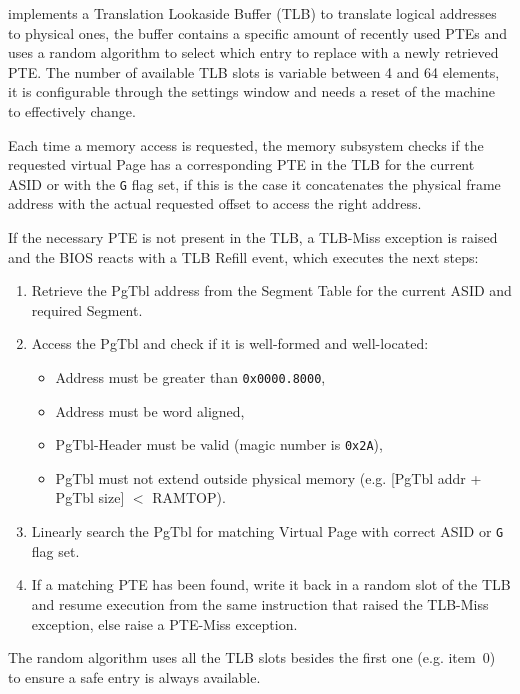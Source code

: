 \vspace{5px}
\begin{adjustbox}{center}

\end{adjustbox}
\vspace{5px}


\uarm{} implements a Translation Lookaside Buffer (TLB) to translate logical addresses to physical ones, the buffer contains a specific amount of recently used PTEs and uses a random algorithm to select which entry to replace with a newly retrieved PTE.
The number of available TLB slots is variable between 4 and 64 elements, it is configurable through the settings window and needs a reset of the machine to effectively change.

Each time a memory access is requested, the memory subsystem checks if the requested virtual Page has a corresponding PTE in the TLB for the current ASID or with the \texttt{G} flag set, if this is the case it concatenates the physical frame address with the actual requested offset to access the right address.

If the necessary PTE is not present in the TLB, a TLB-Miss exception is raised and the BIOS reacts with a TLB Refill event, which executes the next steps:
\begin{enumerate}
\item Retrieve the PgTbl address from the Segment Table for the current ASID and required Segment.
\item Access the PgTbl and check if it is well-formed and well-located:
	\begin{itemize}
	\item Address must be greater than \texttt{0x0000.8000},
	\item Address must be word aligned,
	\item PgTbl-Header must be valid (magic number is \texttt{0x2A}),
	\item PgTbl must not extend outside physical memory (e.g. [PgTbl addr + PgTbl size] $<$ RAMTOP).
	\end{itemize}
\item Linearly search the PgTbl for matching Virtual Page with correct ASID or \texttt{G} flag set.
\item If a matching PTE has been found, write it back in a random slot of the TLB and resume execution from the same instruction that raised the TLB-Miss exception, else raise a PTE-Miss exception.
\end{enumerate}

The random algorithm uses all the TLB slots besides the first one (e.g. item~0) to ensure a safe entry is always available.
